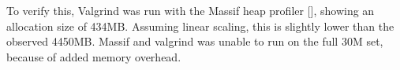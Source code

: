 To verify this, Valgrind was run with the Massif heap profiler
[\pageref{fig:Massif_map_30m}], showing an allocation size of 434MB. Assuming
linear scaling, this is slightly lower than the observed 4450MB. Massif and
valgrind was unable to run on the full 30M set, because of added memory
overhead.
\begin{landscape}
    \begin{figure}[h]
\end{figure}
\end{landscape}
